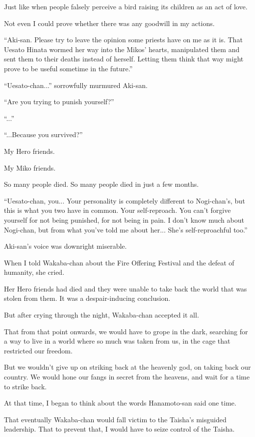 Just like when people falsely perceive a bird raising its children as an act of love.

Not even I could prove whether there was any goodwill in my actions.

``Aki-san. Please try to leave the opinion some priests have on me as it is. That Uesato Hinata wormed her way into the Mikos' hearts, manipulated them and sent them to their deaths instead of herself. Letting them think that way might prove to be useful sometime in the future.''

``Uesato-chan...'' sorrowfully murmured Aki-san.

``Are you trying to punish yourself?''

``...''

``...Because you survived?''

My Hero friends.

My Miko friends.

So many people died. So many people died in just a few months.

``Uesato-chan, you... Your personality is completely different to Nogi-chan's, but this is what you two have in common. Your self-reproach. You can't forgive yourself for not being punished, for not being in pain. I don't know much about Nogi-chan, but from what you've told me about her... She's self-reproachful too.''

Aki-san's voice was downright miserable.

When I told Wakaba-chan about the Fire Offering Festival and the defeat of humanity, she cried.

Her Hero friends had died and they were unable to take back the world that was stolen from them. It was a despair-inducing conclusion.

But after crying through the night, Wakaba-chan accepted it all.

That from that point onwards, we would have to grope in the dark, searching for a way to live in a world where so much was taken from us, in the cage that restricted our freedom.

But we wouldn't give up on striking back at the heavenly god, on taking back our country. We would hone our fangs in secret from the heavens, and wait for a time to strike back.

At that time, I began to think about the words Hanamoto-san said one time.

That eventually Wakaba-chan would fall victim to the Taisha's misguided leadership. That to prevent that, I would have to seize control of the Taisha.

